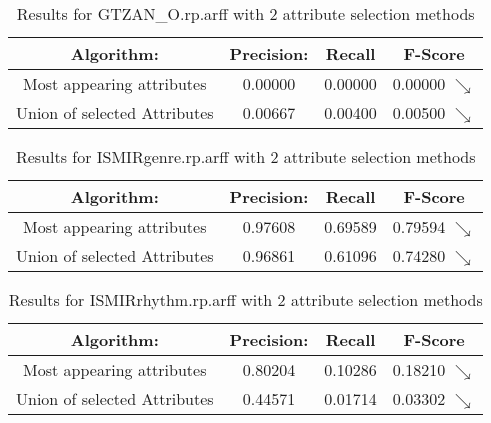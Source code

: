\begin{table}[p]
\begin{center}
\begin{tabular}{|c|c|c|c|}
\hline Algorithm: & Precision: & Recall & F-Score\\
\hline Most appearing attributes & 0.00000 & 0.00000 & 0.00000 $\searrow$\\
\hline Union of selected Attributes & 0.00667 & 0.00400 & 0.00500 $\searrow$\\

\hline
\end{tabular}
\caption{Results for GTZAN\_O.rp.arff with 2 attribute selection methods}
\label{table:classifier:GTZANO2}
\end{center}
\end{table}


\begin{table}[p]
\begin{center}
\begin{tabular}{|c|c|c|c|}
\hline Algorithm: & Precision: & Recall & F-Score\\
\hline Most appearing attributes & 0.97608 & 0.69589 & 0.79594 $\searrow$\\
\hline Union of selected Attributes & 0.96861 & 0.61096 & 0.74280 $\searrow$\\

\hline
\end{tabular}
\caption{Results for ISMIRgenre.rp.arff with 2 attribute selection methods}
\label{table:classifier:ISMIRgenre2}
\end{center}
\end{table}


\begin{table}[p]
\begin{center}
\begin{tabular}{|c|c|c|c|}
\hline Algorithm: & Precision: & Recall & F-Score\\
\hline Most appearing attributes & 0.80204 & 0.10286 & 0.18210 $\searrow$\\
\hline Union of selected Attributes & 0.44571 & 0.01714 & 0.03302 $\searrow$\\

\hline
\end{tabular}
\caption{Results for ISMIRrhythm.rp.arff with 2 attribute selection methods}
\label{table:classifier:ISMIRrhythm2}
\end{center}
\end{table}


